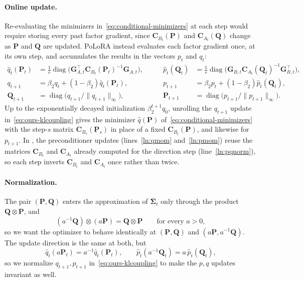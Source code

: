 \documentclass{article}
\newcommand{\mat}[1]{\bm{#1}}
\DeclareMathOperator{\diag}{diag}
\newcommand{\norm}[1]{\| #1\|}
\newcommand{\methodname}{PoLoRA\xspace}
\begin{document}
\paragraph{Online update.} Re-evaluating the minimizers
in~\eqref{eq:conditional-minimizers} at each step would require
storing every past factor gradient, since $\mat{C}_{B_t}(\mat{P})$ and $\mat{C}_{A_t}(\mat{Q})$ change
as $\mat{P}$ and $\mat{Q}$ are updated. \methodname{} instead evaluates each factor
gradient once, at its own step, and accumulates the results in the vectors
$p_t$ and $q_t$:
\begin{equation}\label{eq:ours-klcoupling}
\begin{alignedat}{2}
  \hat{q}_t(\mat{P}_t)
    &= \frac1r\diag\bigl(\mat{G}_{A,t}^\top \mat{C}_{B_t}(\mat{P}_t)^{-1}\mat{G}_{A,t}\bigr),
  &\qquad
  \hat{p}_t(\mat{Q}_t)
    &= \frac1r\diag\bigl(\mat{G}_{B,t} \mat{C}_{A_t}(\mat{Q}_t)^{-1}\mat{G}_{B,t}^\top\bigr),
  \\
  q_{t+1}
    &= \beta_2q_t+(1-\beta_2)\hat{q}_t(\mat{P}_t),
  &\qquad
  p_{t+1}
    &= \beta_2p_t+(1-\beta_2)\hat{p}_t(\mat{Q}_t),
  \\
  \mat{Q}_{t+1}
    &= \diag\bigl(q_{t+1}/\norm{q_{t+1}}_\infty\bigr),
  &\qquad
  \mat{P}_{t+1}
    &= \diag\bigl(p_{t+1}/\norm{p_{t+1}}_\infty\bigr).
\end{alignedat}
\end{equation}
Up to the exponentially decayed initialization $\beta_2^{t+1}q_0$, unrolling the
$q_{t+1}$ update in~\eqref{eq:ours-klcoupling} gives the
minimizer $\hat q(\mat{P})$ of~\eqref{eq:conditional-minimizers} with the
step-$s$ matrix $\mat{C}_{B_s}(\mat{P}_s)$ in place of a fixed $\mat{C}_{B_t}(\mat{P})$, and likewise for $p_{t+1}$. In , the preconditioner updates (lines~\ref{ln:qmom}
and~\ref{ln:pmom}) reuse the matrices $\mat{C}_{B_t}$ and $\mat{C}_{A_t}$ already computed for the direction step (line~\ref{ln:pqnorm}), so each step inverts $\mat{C}_{B_t}$ and $\mat{C}_{A_t}$ once rather than twice.

\paragraph{Normalization.} The pair $(\mat{P}, \mat{Q})$ enters the
approximation of $\overline{\mat{\Sigma}}_t$ only through the product
$\mat{Q} \otimes \mat{P}$, and
\[
  (a^{-1}\mat{Q})\otimes(a\mat{P})=\mat{Q}\otimes \mat{P}
  \qquad\text{for every } a>0,
\]
so we want the optimizer to behave identically at $(\mat{P},\mat{Q})$ and
$(a\mat{P},a^{-1}\mat{Q})$. The update direction is the same at both, but
\[
  \hat q_t(a\mat{P}_t)=a^{-1}\hat q_t(\mat{P}_t),
  \qquad
  \hat p_t(a^{-1}\mat{Q}_t)=a\,\hat p_t(\mat{Q}_t),
\]
so we normalize $q_{t+1},p_{t+1}$ in~\eqref{eq:ours-klcoupling} to
make the $p,q$ updates invariant as well.
\end{document}
